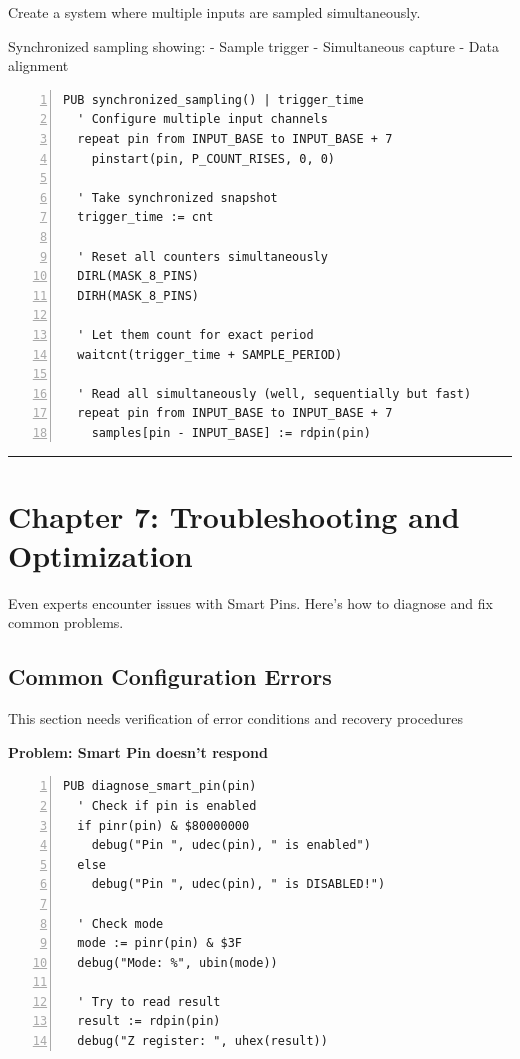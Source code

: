 \documentclass[11pt,a4paper,oneside,english]{book}
\begin{document}
Create a system where multiple inputs are sampled simultaneously.

Synchronized sampling showing: - Sample trigger - Simultaneous capture -
Data alignment

\begin{Spin2Block}
\begin{Verbatim}[numbers=left,numbersep=5pt,xleftmargin=15pt]
PUB synchronized_sampling() | trigger_time
  ' Configure multiple input channels
  repeat pin from INPUT_BASE to INPUT_BASE + 7
    pinstart(pin, P_COUNT_RISES, 0, 0)
  
  ' Take synchronized snapshot
  trigger_time := cnt
  
  ' Reset all counters simultaneously
  DIRL(MASK_8_PINS)
  DIRH(MASK_8_PINS)
  
  ' Let them count for exact period
  waitcnt(trigger_time + SAMPLE_PERIOD)
  
  ' Read all simultaneously (well, sequentially but fast)
  repeat pin from INPUT_BASE to INPUT_BASE + 7
    samples[pin - INPUT_BASE] := rdpin(pin)
\end{Verbatim}
\end{Spin2Block}

\begin{center}\rule{0.5\linewidth}{0.5pt}\end{center}

\clearpage

\clearpage

\hypertarget{chapter-7-troubleshooting-and-optimization}{%
\chapter{Chapter 7: Troubleshooting and
Optimization}\label{chapter-7-troubleshooting-and-optimization}}

Even experts encounter issues with Smart Pins. Here's how to diagnose
and fix common problems.

\hypertarget{common-configuration-errors}{%
\section{Common Configuration
Errors}\label{common-configuration-errors}}

This section needs verification of error conditions and recovery
procedures

\textbf{Problem: Smart Pin doesn't respond}

\begin{Spin2Block}
\begin{Verbatim}[numbers=left,numbersep=5pt,xleftmargin=15pt]
PUB diagnose_smart_pin(pin)
  ' Check if pin is enabled
  if pinr(pin) & $80000000
    debug("Pin ", udec(pin), " is enabled")
  else
    debug("Pin ", udec(pin), " is DISABLED!")
    
  ' Check mode
  mode := pinr(pin) & $3F
  debug("Mode: %", ubin(mode))
  
  ' Try to read result
  result := rdpin(pin)
  debug("Z register: ", uhex(result))
\end{Verbatim}
\end{Spin2Block}
\end{document}
